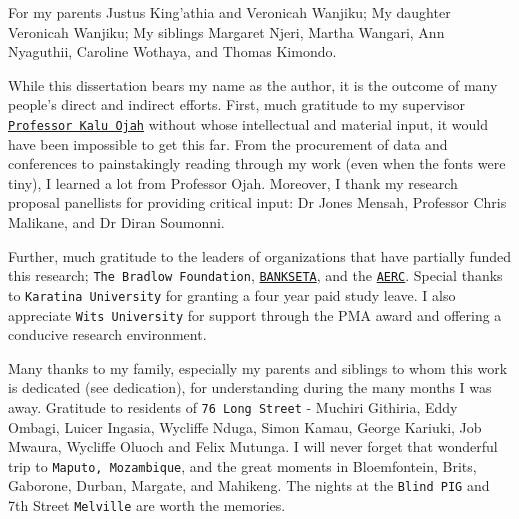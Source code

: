 \documentclass[a4paper, nobind]{templates/ociamthesis}
\begin{document}

\begin{romanpages}

\maketitle

\begin{dedication}
  For my parents Justus King'athia and Veronicah Wanjiku; My daughter Veronicah Wanjiku; My siblings Margaret Njeri, Martha Wangari, Ann Nyaguthii, Caroline Wothaya, and Thomas Kimondo.
\end{dedication}

\begin{acknowledgements}
 	While this dissertation bears my name as the author, it is the outcome of many people's direct and indirect efforts. First, much gratitude to my supervisor \href{https://www.wits.ac.za/staff/academic-a-z-listing/o/kaluojahwitsacza/}{\texttt{Professor\ Kalu\ Ojah}} without whose intellectual and material input, it would have been impossible to get this far. From the procurement of data and conferences to painstakingly reading through my work (even when the fonts were tiny), I learned a lot from Professor Ojah. Moreover, I thank my research proposal panellists for providing critical input: Dr Jones Mensah, Professor Chris Malikane, and Dr Diran Soumonni.

  Further, much gratitude to the leaders of organizations that have partially funded this research; \texttt{The\ Bradlow\ Foundation}, \href{https://www.bankseta.org.za/}{\texttt{BANKSETA}}, and the \href{https://aercafrica.org}{\texttt{AERC}}. Special thanks to \texttt{Karatina\ University} for granting a four year paid study leave. I also appreciate \texttt{Wits\ University} for support through the PMA award and offering a conducive research environment.

  Many thanks to my family, especially my parents and siblings to whom this work is dedicated (see dedication), for understanding during the many months I was away. Gratitude to residents of \texttt{76\ Long\ Street} - Muchiri Githiria, Eddy Ombagi, Luicer Ingasia, Wycliffe Nduga, Simon Kamau, George Kariuki, Job Mwaura, Wycliffe Oluoch and Felix Mutunga. I will never forget that wonderful trip to \texttt{Maputo,\ Mozambique}, and the great moments in Bloemfontein, Brits, Gaborone, Durban, Margate, and Mahikeng. The nights at the \texttt{Blind\ PIG} and 7th Street \texttt{Melville} are worth the memories.


\end{acknowledgements}
\end{romanpages}
\end{document}
